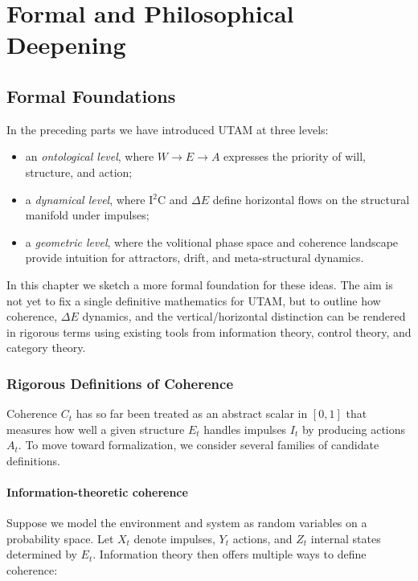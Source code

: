 \documentclass[12pt,a4paper]{report}
\newcommand{\Will}{W}
\newcommand{\Struct}{E}
\newcommand{\Act}{A}
\begin{document}
\part{Formal and Philosophical Deepening}

\chapter{Formal Foundations}

In the preceding parts we have introduced UTAM at three levels:

\begin{itemize}[leftmargin=2em]
    \item an \emph{ontological level}, where \(\Will \to \Struct \to \Act\) expresses the priority of will, structure, and action;
    \item a \emph{dynamical level}, where I$^2$C and \(\Delta E\) define horizontal flows on the structural manifold under impulses;
    \item a \emph{geometric level}, where the volitional phase space and coherence landscape provide intuition for attractors, drift, and meta-structural dynamics.
\end{itemize}

In this chapter we sketch a more formal foundation for these ideas. The aim is not yet to fix a single definitive mathematics for UTAM, but to outline how coherence, $\Delta E$ dynamics, and the vertical/horizontal distinction can be rendered in rigorous terms using existing tools from information theory, control theory, and category theory.

\section{Rigorous Definitions of Coherence}

Coherence \(C_t\) has so far been treated as an abstract scalar in \([0,1]\) that measures how well a given structure \(E_t\) handles impulses \(I_t\) by producing actions \(A_t\). To move toward formalization, we consider several families of candidate definitions.

\subsection*{Information-theoretic coherence}

Suppose we model the environment and system as random variables on a probability space. Let \(X_t\) denote impulses, \(Y_t\) actions, and \(Z_t\) internal states determined by \(E_t\). Information theory then offers multiple ways to define coherence:
\end{document}
